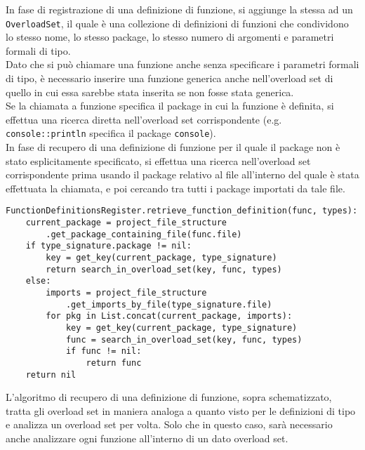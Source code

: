 In fase di registrazione di una definizione di funzione, si aggiunge la stessa ad un \texttt{OverloadSet}, 
il quale è una collezione di definizioni di funzioni che condividono lo stesso nome, lo stesso package, lo stesso numero di argomenti e 
parametri formali di tipo. \\

Dato che si può chiamare una funzione anche senza specificare i parametri formali di tipo, è necessario
inserire una funzione generica anche nell'overload set di quello in cui essa sarebbe stata inserita se non fosse 
stata generica. \\

Se la chiamata a funzione specifica il package in cui la funzione è definita, si effettua una ricerca diretta
nell'overload set corrispondente (e.g. \texttt{console::println} specifica il package \texttt{console}). \\

In fase di recupero di una definizione di funzione per il quale il package non è stato esplicitamente specificato, 
si effettua una ricerca nell'overload set corrispondente prima usando il package relativo al file all'interno del 
quale è stata effettuata la chiamata, e poi cercando tra tutti i package importati da tale file.

\vspace{0.5cm}
\begin{lstlisting}[frame=single]
FunctionDefinitionsRegister.retrieve_function_definition(func, types):
    current_package = project_file_structure
        .get_package_containing_file(func.file)
    if type_signature.package != nil:
        key = get_key(current_package, type_signature)
        return search_in_overload_set(key, func, types)
    else:
        imports = project_file_structure
            .get_imports_by_file(type_signature.file)
        for pkg in List.concat(current_package, imports):
            key = get_key(current_package, type_signature)
            func = search_in_overload_set(key, func, types)
            if func != nil:
                return func
    return nil
\end{lstlisting}
\vspace{0.5cm}

L'algoritmo di recupero di una definizione di funzione, sopra schematizzato, tratta gli overload set in 
maniera analoga a quanto visto per le definizioni di tipo e analizza un overload set per volta. Solo che 
in questo caso, sarà necessario anche analizzare ogni funzione all'interno di un dato overload set. \\

